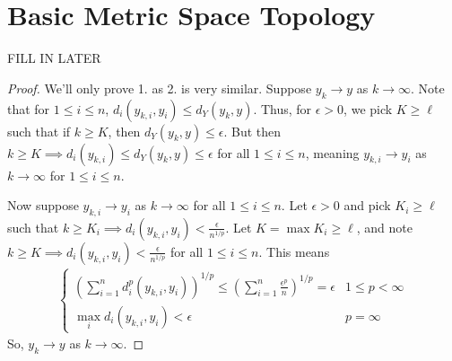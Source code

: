 \documentclass{report}
\begin{document}
\chapter{Basic Metric Space Topology}


FILL IN LATER 


\begin{proof}
    We'll only prove 1. as 2. is very similar. Suppose $y_k \to y$ as $k \to \infty$. Note that for $ 1 \leq i \leq n$, $d_i(y_{k, i}, y_i) \leq d_Y(y_k, y)$. Thus, for $\epsilon > 0$, we pick $K \geq \ell$ such that if $k \geq K$, then $d_Y(y_k, y) \leq \epsilon$. But then $k \geq K \implies d_i(y_{k ,i}) \leq d_Y(y_k, y) \leq \epsilon$ for all $1 \leq i \leq n$, meaning $y_{k ,i} \to y_i$ as $k \to \infty$ for $1 \leq i \leq n$. 

    Now suppose $y_{k ,i} \to y_i$ as $k \to \infty$ for all $1 \leq i \leq n$. Let $\epsilon > 0$ and pick $K_i \geq \ell$ such that $k \geq K_i \implies d_i(y_{k ,i}, y_i) < \frac{\epsilon}{n^{1/p}}$. Let $K = \max K_i \geq \ell$, and note $k \geq K \implies d_i(y_{k ,i}, y_i) < \frac{\epsilon}{n^{1/p}}$ for all $1 \leq i \leq n$. This means 
    \begin{align*}
        \begin{cases}
            \left(\sum_{i=1}^n d_i^p(y_{k, i}, y_i)\right)^{1/p}  \leq \left(\sum_{i=1}^n \frac{\epsilon^p}{n}\right)^{1/p} = \epsilon & 1 \leq p < \infty \\
            \max_i d_i(y_{k, i}, y_i)  < \epsilon & p = \infty
        \end{cases}
    \end{align*}
    So, $y_k \to y$ as $k \to \infty$.
\end{proof}
\end{document}

